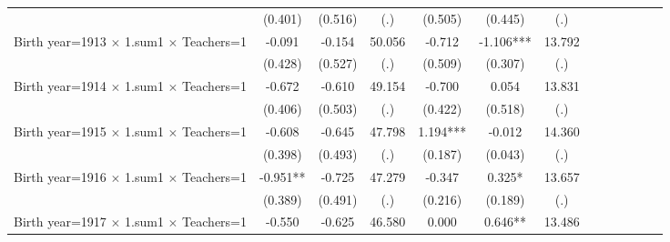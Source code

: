 {\begin{tabular}{l*{12}{c}}
                    &     (0.401)   &     (0.516)   &         (.)   &     (0.505)   &     (0.445)   &         (.)   &               &               &               &               &               &               \\
Birth year=1913 $\times$ 1.sum1 $\times$ Teachers=1&      -0.091   &      -0.154   &      50.056   &      -0.712   &      -1.106***&      13.792   &               &               &               &               &               &               \\
                    &     (0.428)   &     (0.527)   &         (.)   &     (0.509)   &     (0.307)   &         (.)   &               &               &               &               &               &               \\
Birth year=1914 $\times$ 1.sum1 $\times$ Teachers=1&      -0.672   &      -0.610   &      49.154   &      -0.700   &       0.054   &      13.831   &               &               &               &               &               &               \\
                    &     (0.406)   &     (0.503)   &         (.)   &     (0.422)   &     (0.518)   &         (.)   &               &               &               &               &               &               \\
Birth year=1915 $\times$ 1.sum1 $\times$ Teachers=1&      -0.608   &      -0.645   &      47.798   &       1.194***&      -0.012   &      14.360   &               &               &               &               &               &               \\
                    &     (0.398)   &     (0.493)   &         (.)   &     (0.187)   &     (0.043)   &         (.)   &               &               &               &               &               &               \\
Birth year=1916 $\times$ 1.sum1 $\times$ Teachers=1&      -0.951** &      -0.725   &      47.279   &      -0.347   &       0.325*  &      13.657   &               &               &               &               &               &               \\
                    &     (0.389)   &     (0.491)   &         (.)   &     (0.216)   &     (0.189)   &         (.)   &               &               &               &               &               &               \\
Birth year=1917 $\times$ 1.sum1 $\times$ Teachers=1&      -0.550   &      -0.625   &      46.580   &       0.000   &       0.646** &      13.486   &               &               &               &               &               &               \\

\end{tabular}}
